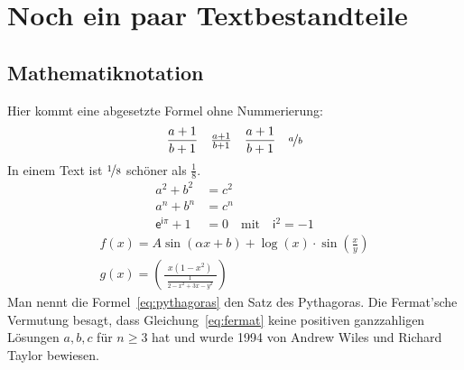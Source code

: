 
\chapter{Noch ein paar Textbestandteile}

\section{Mathematiknotation}

Hier kommt eine abgesetzte Formel ohne Nummerierung:
%
\begin{align*}
	\frac{a+1}{b+1}\quad \tfrac{a+1}{b+1}\quad \dfrac{a+1}{b+1}\quad \nicefrac{a}{b}
\end{align*}
%
In einem Text ist $\nicefrac{1}{8}$ schöner als $\frac{1}{8}$.
%
\begin{align}
	\label{eq:pythagoras}a^{2}+ b^{2}             & = c^{2}                                      \\
	\label{eq:fermat}a^{n}+ b^{n}                 & = c^{n}                                      \\
	\label{eq:schoen}\textsf{e}^{\textsf{i}\pi}+1 & = 0 \quad \text{mit}\quad \textsf{i}^{2}= -1
\end{align}
%
\begin{align}
	f(x) = A \sin(\alpha x + b) + \log(x) \cdot \sin\left(\frac{x}{y}\right)    \\
	g(x) = \left(\frac{\ \ x (1-x^{2})\ \ }{\frac{1}{2-x^{2}+3x -y^{2}}}\right)
\end{align}
%
Man nennt die Formel~\eqref{eq:pythagoras} den Satz des Pythagoras. Die Fermat'sche
Vermutung besagt, dass Gleichung~\eqref{eq:fermat} keine positiven ganzzahligen
Lösungen $a, b, c$ für $n \ge 3$ hat und wurde 1994 von Andrew Wiles und Richard
Taylor bewiesen.

